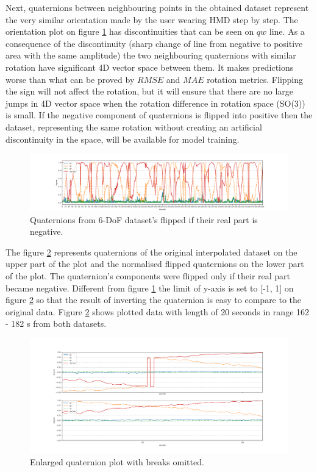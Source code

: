 Next, quaternions between neighbouring points in the obtained dataset represent the very similar orientation made by the user wearing HMD step by step. The orientation plot on figure \ref{fig:norm_data} has discontinuities that can be seen on $qw$ line. As a consequence of the discontinuity (sharp change of line from negative to positive area with the same amplitude) the two neighbouring quaternions with similar rotation have significant 4D vector space between them. It makes predictions worse than what can be proved by $RMSE$ and $MAE$ rotation metrics. Flipping the sign will not affect the rotation, but it will ensure that there are no large jumps in 4D vector space when the rotation difference in rotation space (SO(3)) is small. If the negative component of quaternions is flipped into positive then the dataset, representing the same rotation without creating an artificial discontinuity in the space, will be available for model training. 

\begin{figure}[htb]
	\begin{center}
		\includegraphics[width=1\textwidth, keepaspectratio]{gfx/Fig-1556-quaternions_flipped.pdf}
		\caption{\label{fig:norm_data} Quaternions from 6-DoF dataset's flipped if their real part is negative.}
	\end{center}
\end{figure}

The figure \ref{fig:compare} represents quaternions of the original interpolated dataset on the upper part of the plot and the normalised flipped quaternions on the lower part of the plot. The quaternion's components were flipped only if their real part became negative. Different from figure \ref{fig:norm_data} the limit of y-axis is set to [-1, 1] on figure \ref{fig:compare} so that the result of inverting the quaternion is easy to compare to the original data. Figure \ref{fig:compare} shows plotted data with length of 20 seconds in range 162 - 182 s from both datasets.
\begin{figure}[htb]
	\begin{center}
		\includegraphics[width=1\textwidth, keepaspectratio]{gfx/Fig-1556-compare.pdf}
		\caption{\label{fig:compare} Enlarged quaternion plot with breaks omitted.}
	\end{center}
\end{figure}

